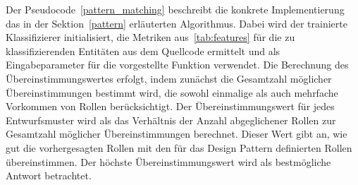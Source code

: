 Der Pseudocode~\ref{pattern_matching} beschreibt die konkrete Implementierung das in der Sektion~\ref{pattern} erläuterten Algorithmus.
Dabei wird der trainierte Klassifizierer initialisiert, die Metriken aus~\ref{tab:features} für die zu klassifizierenden Entitäten aus dem Quellcode ermittelt und als Eingabeparameter für die vorgestellte Funktion verwendet.
Die Berechnung des Übereinstimmungswertes erfolgt, indem zunächst die Gesamtzahl möglicher Übereinstimmungen bestimmt wird, die sowohl einmalige als auch mehrfache Vorkommen von Rollen berücksichtigt. Der Übereinstimmungswert für jedes Entwurfsmuster wird als das Verhältnis der Anzahl abgeglichener Rollen zur Gesamtzahl möglicher Übereinstimmungen berechnet. 
Dieser Wert gibt an, wie gut die vorhergesagten Rollen mit den für das Design Pattern definierten Rollen übereinstimmen. Der höchste Übereinstimmungswert wird als bestmögliche Antwort betrachtet.